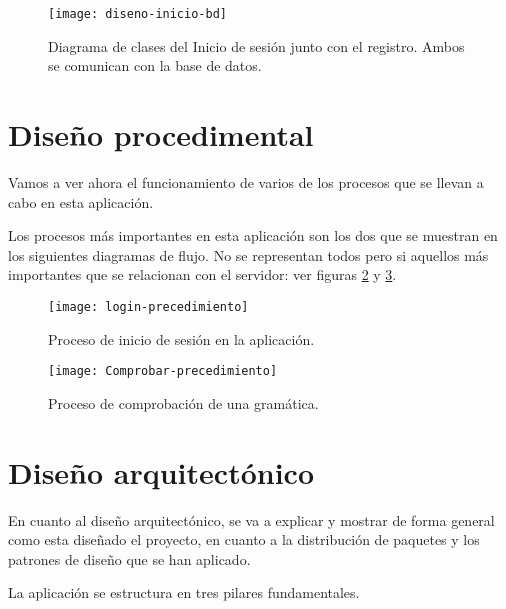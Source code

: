 \begin{figure}[h]
\centering
\texttt{[image: diseno-inicio-bd]}
\caption{Diagrama de clases del Inicio de sesión junto con el registro. Ambos se comunican con la base de datos.}
\label{fig:4.5}
\end{figure}


\section{Diseño procedimental}

Vamos a ver ahora el funcionamiento de varios de los procesos que se llevan a cabo en esta aplicación.
 
Los procesos más importantes en esta aplicación son los dos que se muestran en los siguientes diagramas de flujo. No se representan todos pero si aquellos más importantes que se relacionan con el servidor: ver figuras \ref{fig:4.6} y \ref{fig:4.7}.
 \begin{figure}[h]
\centering
\texttt{[image: login-precedimiento]}
\caption{Proceso de inicio de sesión en la aplicación.}
\label{fig:4.6}
\end{figure}

\begin{figure}[h]
\centering
\texttt{[image: Comprobar-precedimiento]}
\caption{Proceso de comprobación de una gramática.}
\label{fig:4.7}
\end{figure}


\section{Diseño arquitectónico}

En cuanto al diseño arquitectónico, se va a explicar y mostrar de forma general como esta diseñado el proyecto, en cuanto a la distribución de paquetes y los patrones de diseño que se han aplicado.

La aplicación se estructura en tres pilares fundamentales.


